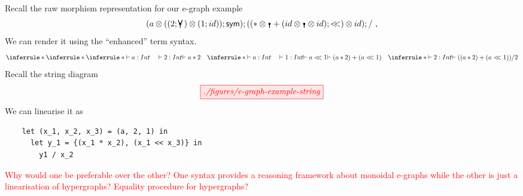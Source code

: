 \documentclass[acmsmall,screen, nonacm, anonymous]{acmart}
\begin{document}
\begin{example}
  Recall the raw morphism representation for our e-graph example
  \[(a \otimes ((2;\comonoid) \otimes (1;id));\sym);((* \otimes \counit + (id \otimes \counit \otimes id);<\!\!<) \otimes id);/~,\]
  We can render it using the  \enquote{enhanced} term syntax.
  \[
  \inferrule*{
  \inferrule*{
  \inferrule*{\vdash a : Int \quad \vdash 2 : Int}{\vdash a * 2}
  \quad
  \inferrule*{\vdash a : Int \quad \vdash 1 : Int}{\vdash a <\!\!< 1}
  }{\vdash (a * 2) + (a <\!\!< 1)}
  \quad
  \inferrule*{}{\vdash 2 : Int}
  }
  {\vdash ((a * 2) + (a <\!\!< 1)) / 2}
  \]
  Recall the string diagram
  \[
  \tikzfig{./figures/e-graph-example-string}
  \]
  We can linearise it as
  \begin{verbatim}
    let (x_1, x_2, x_3) = (a, 2, 1) in
      let y_1 = {(x_1 * x_2), (x_1 << x_3)} in
        y1 / x_2
  \end{verbatim}
  \textcolor{red}{Why would one be preferable over the other? One syntax provides a reasoning framework about monoidal e-graphs while the other is just a linearisation of hypergraphs? Equality procedure for hypergraphs?}
\end{example}



\end{document}
